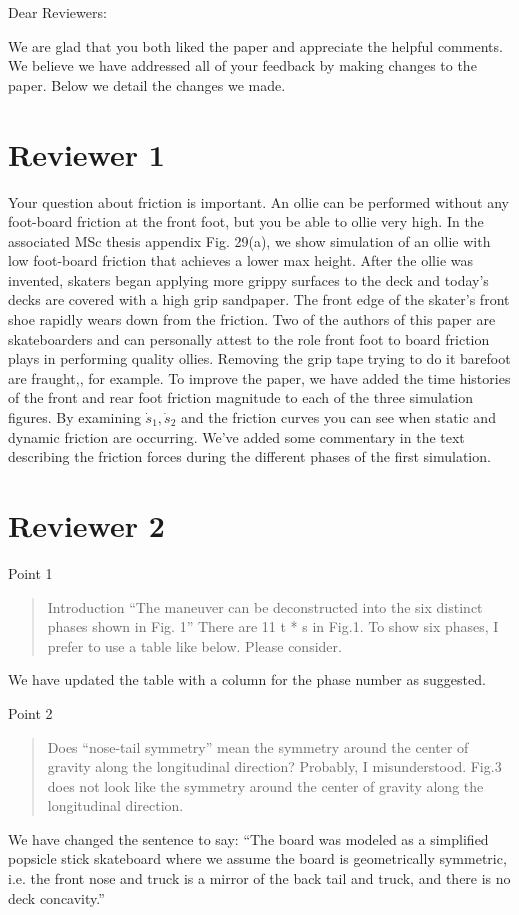 \documentclass{letter}
\begin{document}
\begin{letter}{}
\opening{Dear Reviewers:}

We are glad that you both liked the paper and appreciate the helpful comments. We believe we have addressed all of your feedback by making changes to the paper. Below we detail the changes we made.

\section{Reviewer 1}

Your question about friction is important. An ollie can be performed without any foot-board friction at the front foot, but you be able to ollie very high. In the associated MSc thesis appendix Fig. 29(a), we show simulation of an ollie with low foot-board friction that achieves a lower max height. After the ollie was invented, skaters began applying more grippy surfaces to the deck and today's decks are covered with a high grip sandpaper. The front edge of the skater's front shoe rapidly wears down from the friction. Two of the authors of this paper are skateboarders and can personally attest to the role front foot to board friction plays in performing quality ollies. Removing the grip tape trying to do it barefoot are fraught,, for example. To improve the paper, we have added the time histories of the front and rear foot friction magnitude to each of the three simulation figures. By examining \(\dot{s}_1,\dot{s}_2\) and the friction curves you can see when static and dynamic friction are occurring. We've added some commentary in the text describing the friction forces during the different phases of the first simulation.

\section{Reviewer 2}

Point 1

\begin{quote}
    Introduction ``The maneuver can be deconstructed into the six distinct phases shown in Fig. 1'' There are 11 t * s in Fig.1. To show six phases, I prefer to use a table like below. Please consider.
\end{quote}

We have updated the table with a column for the phase number as suggested.

Point 2

\begin{quote}
    Does ``nose-tail symmetry'' mean the symmetry around the center of gravity along the longitudinal direction? Probably, I misunderstood. Fig.3 does not look like the symmetry around the center of gravity along the longitudinal direction.
\end{quote}
We have changed the sentence to say: ``The board was modeled as a simplified popsicle stick skateboard where we assume the board is geometrically symmetric, i.e. the front nose and truck is a mirror of the back tail and truck, and there is no deck concavity.''


\end{letter}
\end{document}
